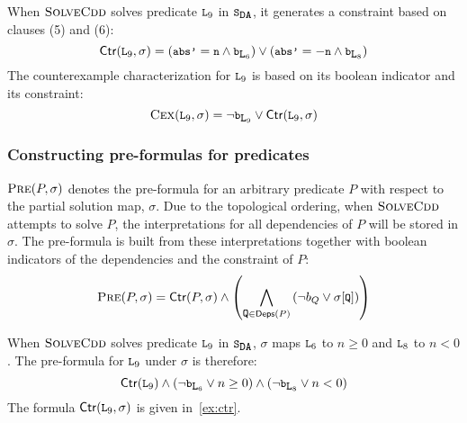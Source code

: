 \begin{ex}
  \label{ex:ctr}
  When $\textsc{SolveCdd}$ solves predicate $\cc{L}_9$ in $\mcchc$, it generates a
  constraint based on clauses (5) and (6):
  $$\ctrof{\cc{L}_9,\sigma} =
    (\cc{abs'} = \cc{n} \land \cc{b}_{\cc{L}_6})
    \lor
    (\cc{abs'} = -\cc{n} \land \cc{b}_{\cc{L}_8})$$
  The counterexample characterization for $\cc{L}_9$ is based on its boolean
  indicator and its constraint:
  $$\vc{\cc{L}_9,\sigma} = \neg \cc{b}_{\cc{L}_9} \lor \ctrof{\cc{L}_9,\sigma}$$
\end{ex}

\subsubsection{Constructing pre-formulas for predicates}
\label{sec:cons-pre}
%
$\textsc{Pre}(P, \sigma)$ denotes the pre-formula for an arbitrary predicate $P$
with respect to the partial solution map, $\sigma$.
%
Due to the topological ordering, when $\textsc{SolveCdd}$ attempts to solve $P$, the
interpretations for all dependencies of $P$ will be stored in
$\sigma$.
%
The pre-formula is built from these interpretations together with boolean
indicators of the dependencies and the constraint of $P$:
%
\[
\prectr(P,\sigma) =
  \ctrof{P,\sigma} \land
    \left(
      \bigland_{\cc{Q} \in \depsof{P}}
      \left(\neg b_Q \lor \sigma[ \cc{Q} ]  \right)
    \right)
\]
%
\begin{ex}
  \label{ex:pre-ctr}
  When $\textsc{SolveCdd}$ solves predicate $\cc{L}_9$ in $\mcchc$,
  $\sigma$ maps $\cc{L}_6$ to $n \ge 0$ and $\cc{L}_8$ to $n < 0$.
  The pre-formula for $\cc{L}_9$ under $\sigma$ is therefore:
  $$\ctrof{\cc{L}_9}
  \land (\neg \cc{b}_{\cc{L}_6} \lor n \ge 0) \land (\neg \cc{b}_{\cc{L}_8}
  \lor n < 0)$$
  The formula $\ctrof{\cc{L}_9,\sigma}$ is given in~\autoref{ex:ctr}.
\end{ex}

